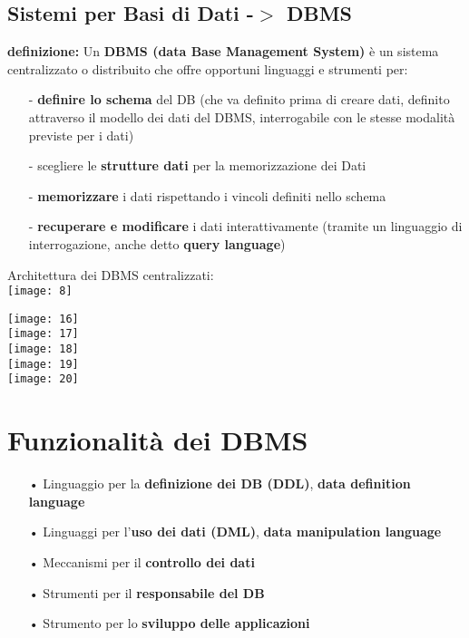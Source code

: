 \documentclass[12pt, letterpaper]{article}
\begin{document}
\subsection{Sistemi per Basi di Dati -$>$ DBMS}

\textbf{definizione:} Un \textbf{DBMS (data Base Management System)} è un sistema centralizzato o distribuito che offre opportuni linguaggi e strumenti per:\\
\begin{itemize}
   \item[-] \textbf{definire lo schema} del DB (che va definito prima di creare dati, definito attraverso il modello dei dati del DBMS, interrogabile con le stesse modalità previste per i dati)
   \item[-] scegliere le \textbf{strutture dati} per la memorizzazione dei Dati
   \item[-] \textbf{memorizzare} i dati rispettando i vincoli definiti nello schema
   \item[-] \textbf{recuperare e modificare} i dati interattivamente (tramite un linguaggio di interrogazione, anche detto \textbf{query language})
\end{itemize}

Architettura dei DBMS centralizzati:\\

\texttt{[image: 8]}

\texttt{[image: 16]}\\
\texttt{[image: 17]}\\
\texttt{[image: 18]}\\
\texttt{[image: 19]}\\
\texttt{[image: 20]}

\section{Funzionalità dei DBMS}
\begin{itemize}
   \item[•] Linguaggio per la \textbf{definizione dei DB (DDL)}, \textbf{data definition language}
   \item[•] Linguaggi per l'\textbf{uso dei dati (DML)}, \textbf{data manipulation language}
   \item[•] Meccanismi per il \textbf{controllo dei dati}
   \item[•] Strumenti per il \textbf{responsabile del DB}
   \item[•] Strumento per lo \textbf{sviluppo delle applicazioni}
\end{itemize}
\end{document}
